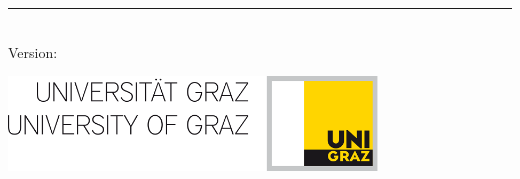 \begin{titlepage}
	\flushright
	\hfill
	\vfill
	{\LARGE\thesisTitle \par}
	\rule[5pt]{\textwidth}{.4pt} \par
	{\Large\thesisName}
	\vfill
	\textit{\large\thesisDate} \\
	Version: \thesisVersion
\end{titlepage}


\begin{titlepage}
	\tgherosfont
	\centering

	\includegraphics[height=25mm]{latex/img/KFU_generalLogo} \\[2mm]

	\vfill
	{\large \thesisSubject} \\[5mm]
	{\LARGE \color{ctcolortitle}\textbf{\thesisTitle} \\[10mm]}
	{\Large \thesisName} \\


\end{titlepage}

